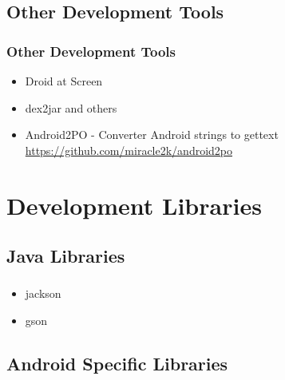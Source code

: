 \documentclass{beamer}
\begin{document}
  \subsection{Other Development Tools}

    \begin{frame}
      \frametitle{Other Development Tools}
      \begin{itemize}
        \item<1->Droid at Screen 
        \item<2->dex2jar and others
        \item<3->Android2PO - Converter Android strings to gettext \url{https://github.com/miracle2k/android2po}
      \end{itemize}
    \end{frame}

\section{Development Libraries}


  \subsection{Java Libraries}

    \begin{frame}
      \frametitle{}
      \begin{itemize}
        \item<1->jackson
        \item<2->gson
      \end{itemize}
    \end{frame}

  \subsection{Android Specific Libraries}
\end{document}
